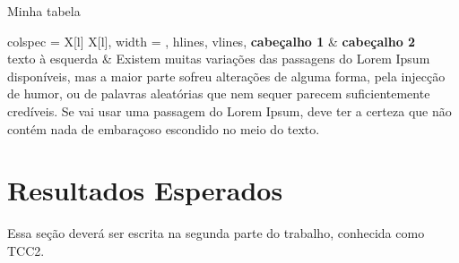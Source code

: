 \documentclass[12pt]{article}
\begin{document}
     \begin{table}[ht]
        \centering
        \caption{Minha tabela}
        \label{tab:id_tabela}
        \begin{tblr}{
          colspec = {X[l] X[l]}, %
          width = \linewidth,
          hlines, %
          vlines, %
        }
        \textbf{cabeçalho 1} & \textbf{cabeçalho 2} \\
        {texto à esquerda} & {Existem muitas variações das passagens do Lorem Ipsum disponíveis, mas a maior parte sofreu alterações de alguma forma, pela injecção de humor, ou de palavras aleatórias que nem sequer parecem suficientemente credíveis. Se vai usar uma passagem do Lorem Ipsum, deve ter a certeza que não contém nada de embaraçoso escondido no meio do texto.}
        \end{tblr}
    \end{table}

\section{Resultados Esperados}
Essa seção deverá ser escrita na segunda parte do trabalho, conhecida como TCC2.


\printbibliography  %
\end{document}
